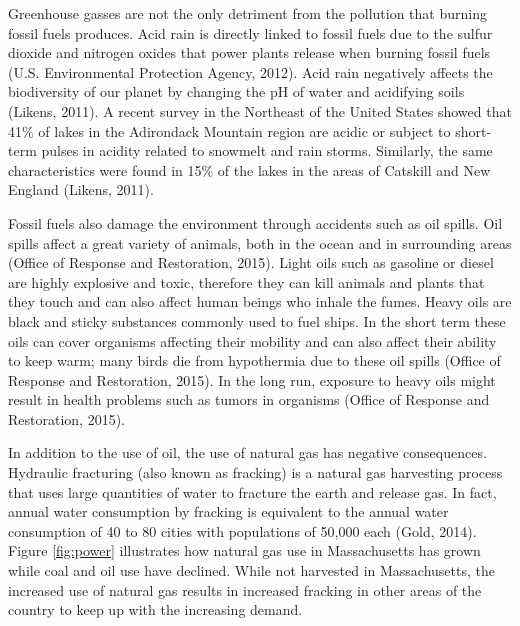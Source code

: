   \par Greenhouse gasses are not the only detriment from the pollution that burning fossil fuels produces. Acid rain is directly linked to fossil fuels due to the sulfur dioxide and nitrogen oxides that power plants release when burning fossil fuels (U.S. Environmental Protection Agency, 2012). Acid rain negatively affects the biodiversity of our planet by changing the pH of water and acidifying soils (Likens, 2011). A recent survey in the Northeast of the United States showed that 41\% of lakes in the Adirondack Mountain region are acidic or subject to short-term pulses in acidity related to snowmelt and rain storms. Similarly, the same characteristics were found in 15\% of the lakes in the areas of Catskill and New England (Likens, 2011).
  \par Fossil fuels also damage the environment through accidents such as oil spills. Oil spills affect a great variety of animals, both in the ocean and in surrounding areas (Office of Response and Restoration, 2015). Light oils such as gasoline or diesel are highly explosive and toxic, therefore they can kill animals and plants that they touch and can also affect human beings who inhale the fumes. Heavy oils are black and sticky substances commonly used to fuel ships. In the short term these oils can cover organisms affecting their mobility and can also affect their ability to keep warm; many birds die from hypothermia due to these oil spills (Office of Response and Restoration, 2015). In the long run, exposure to heavy oils might result in health problems such as tumors in organisms (Office of Response and Restoration, 2015).
  \par In addition to the use of oil, the use of natural gas has negative consequences. Hydraulic fracturing (also known as fracking) is a natural gas harvesting process that uses large quantities of water to fracture the earth and release gas. In fact, annual water consumption by fracking is equivalent to the annual water consumption of 40 to 80 cities with populations of 50,000 each (Gold, 2014). Figure \ref{fig:power} illustrates how natural gas use in Massachusetts has grown while coal and oil use have declined. While not harvested in Massachusetts, the increased use of natural gas results in increased fracking in other areas of the country to keep up with the increasing demand.
